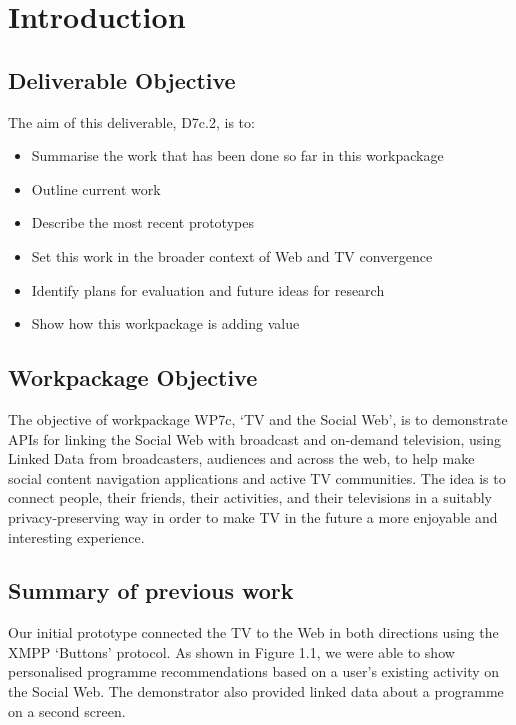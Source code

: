 \documentclass{notube}
\begin{document}
\maketitle

%

\chapter{Introduction}

\section{Deliverable Objective}

The aim of this deliverable, D7c.2, is to:
\begin{itemize}
\item{Summarise the work that has been done so far in this workpackage}
\item{Outline current work}
\item{Describe the most recent prototypes}
\item{Set this work in the broader context of Web and TV convergence}
\item{Identify plans for evaluation and future ideas for research}
\item{Show how this workpackage is adding value}
\end{itemize}

\section{Workpackage Objective}

The objective of workpackage WP7c, `TV and the Social Web', is to demonstrate APIs for linking the Social Web with broadcast and on-demand television, using Linked Data from broadcasters, audiences and across the web, to help make social content navigation applications and active TV communities. The idea is to connect people, their friends, their activities, and their televisions in a suitably privacy-preserving way in order to make TV in the future a more enjoyable and interesting experience.

\section{Summary of previous work}

Our initial prototype connected the TV to the Web in both directions using the XMPP `Buttons' protocol. As shown in Figure 1.1, we  were able to show personalised programme recommendations based on a user's existing activity on the Social Web.  The demonstrator also provided linked data about a programme on a second screen. 
\end{document}
